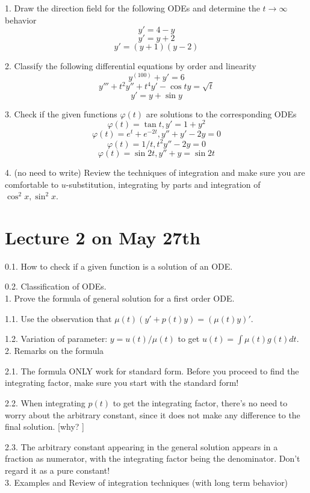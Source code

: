 \documentclass[11pt]{article}
\begin{document}
1. Draw the direction field for the following ODEs and determine the $t\to\infty$ behavior
$$y' = 4 - y$$
$$y' = y + 2$$
$$y' = (y+1)(y-2)$$

2. Classify the following differential equations by order and linearity
$$y^{(100)} + y' = 6$$
$$y''' + t^2 y'' + t^4 y' - \cos t y = \sqrt{t}$$
$$y' = y + \sin y$$

3. Check if the given functions $\varphi(t)$ are solutions to the corresponding ODEs
$$\varphi(t)= \tan t, y' = 1+ y^2$$
$$\varphi(t)= e^t + e^{-2t}, y'' + y' - 2y = 0$$
$$\varphi(t)=1/t, t^2y'' -2 y = 0$$
$$\varphi(t)=\sin 2t, y'' + y = \sin 2t$$

4. (no need to write) Review the techniques of integration and make sure you are comfortable to $u$-substitution, integrating by parts and integration of $\cos^2 x, \sin^2 x$. 

\newpage

\section{Lecture 2 on May 27th}

0.1. How to check if a given function is a solution of an ODE.

0.2. Classification of ODEs.\\



1. Prove the formula of general solution for a first order ODE. 

1.1. Use the observation that $\mu(t) (y' + p(t) y) = (\mu(t) y)'$. 

1.2. Variation of parameter: $y = u(t)/\mu(t)$ to get $u(t) = \int \mu(t) g(t) dt$. \\

2. Remarks on the formula

2.1. The formula ONLY work for standard form. Before you proceed to find the integrating factor, make sure you start with the standard form! 

2.2. When integrating $p(t)$ to get the integrating factor, there's no need to worry about the arbitrary constant, since it does not make any difference to the final solution. [why? ]

2.3. The arbitrary constant appearing in the general solution appears in a fraction as numerator, with the integrating factor being the denominator. Don't regard it as a pure constant! \\ 

3. Examples and Review of integration techniques (with long term behavior)
\end{document}
